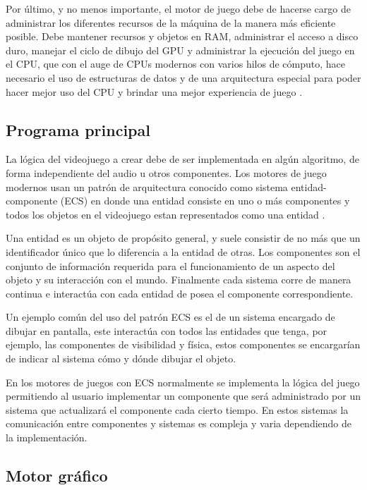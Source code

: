 Por último, y no menos importante, el motor de juego debe de hacerse cargo de administrar los diferentes recursos de la máquina de la manera más eficiente posible. Debe mantener recursos y objetos en RAM, administrar el acceso a disco duro, manejar el ciclo de dibujo del GPU y administrar la ejecución del juego en el CPU, que con el auge de CPUs modernos con varios hilos de cómputo, hace necesario el uso de estructuras de datos y de una arquitectura especial para poder hacer mejor uso del CPU y brindar una mejor experiencia de juego \cite{andrews2009designing}.

\subsection{Programa principal} \label{sec:MTlogica}

La lógica del videojuego a crear debe de ser implementada en algún algoritmo, de forma independiente del audio u otros componentes. Los motores de juego modernos usan un patrón de arquitectura conocido como sistema entidad-componente (ECS) en donde una entidad consiste en uno o más componentes y todos los objetos en el videojuego estan representados como una entidad \cite{JasonGregory-GameEngineArchitecture}.

Una entidad es un objeto de propósito general, y suele consistir de no más que un identificador único que lo diferencia a la entidad de otras. Los componentes son el conjunto de información requerida para el funcionamiento de un aspecto del objeto y su interacción con el mundo. Finalmente cada sistema corre de manera continua e interactúa con cada entidad de posea el componente correspondiente.

Un ejemplo común del uso del patrón ECS es el de un sistema encargado de dibujar en pantalla, este interactúa con todos las entidades que tenga, por ejemplo, las componentes de visibilidad y física, estos componentes se encargarían de indicar al sistema cómo y dónde dibujar el objeto.

En los motores de juegos con ECS normalmente se implementa la lógica del juego permitiendo al usuario implementar un componente que será administrado por un sistema que actualizará el componente cada cierto tiempo. En estos sistemas la comunicación entre componentes y sistemas es compleja y varia dependiendo de la implementación.

\subsection{Motor gráfico}

